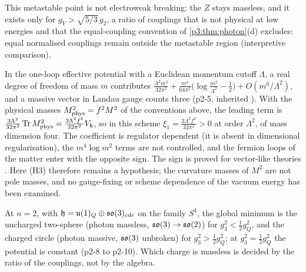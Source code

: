 This metastable point is not electroweak breaking: the $Z$ stays massless, and it exists only for $g_Y>\sqrt{5/3}\,g_2$, a ratio of couplings that is
not physical at low energies and that the equal-coupling convention of \cref{p3:thm:photon}(d) excludes: equal normalised couplings remain outside the
metastable region (interpretive comparison).

\begin{remark}
\label{p2:rem:sign}
In the one-loop effective potential with a Euclidean momentum cutoff $\Lambda$, a real degree of freedom of mass $m$ contributes
$\tfrac{\Lambda^2m^2}{32\pi^2}+\tfrac{m^4}{64\pi^2}\bigl(\log\tfrac{m^2}{\Lambda^2}-\tfrac12\bigr)+O(m^6/\Lambda^2)$, and a massive vector in Landau gauge counts three (p2-5,
inherited \cite{ColemanWeinberg73}). With the physical masses $M^2_{\rm phys}=f^2M^2$ of the conventions above, the leading term is
$\tfrac{3\Lambda^2}{32\pi^2}\operatorname{Tr} M^2_{\rm phys}=\tfrac{3\Lambda^2f^2}{32\pi^2}V_{\mathfrak h}$, so in this scheme $\xi_1=\tfrac{3\Lambda^2f^2}{32\pi^2}>0$ at order
$\Lambda^2$, of mass dimension four. The coefficient is regulator dependent (it is absent in dimensional regularisation), the $m^4\log m^2$ terms are not controlled, and the fermion
loops of the matter enter with the opposite sign. The sign is proved for vector-like theories \cite{Witten83}. Here (H3) therefore remains a hypothesis;
the curvature masses of $M^2$ are not pole masses, and no gauge-fixing or scheme dependence of the vacuum energy has been examined.
\end{remark}

\begin{remark}
\label{p2:rem:n2}
At $n=2$, with $\mathfrak h=\mathfrak{u}(1)_Q\oplus\mathfrak{so}(3)_{cde}$ on the family $S^4$, the global minimum is the uncharged two-sphere (photon massless, $\mathfrak{so}(3)\to\mathfrak{so}(2)$) for
$g_3^2<\tfrac12g_Q^2$, and the charged circle (photon massive, $\mathfrak{so}(3)$ unbroken) for $g_3^2>\tfrac12g_Q^2$; at $g_3^2=\tfrac12g_Q^2$ the potential is constant
(p2-8 to p2-10). Which charge is massless is decided by the ratio of the couplings, not by the algebra.
\end{remark}

